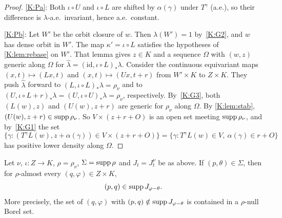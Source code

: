 \begin{proof}
\ref{K:Pa}: Both $\iota\circ U$ and $\iota\circ L$ are shifted by $\alpha(\gamma)$ under
$T^\gamma$ (a.e.), so their difference is $\lambda$-a.e.\ invariant, hence a.e.\ constant.

\ref{K:Pb}: Let $W'$ be the orbit closure of $w$. Then $\lambda(W')=1$ by~\ref{K:G2}, and $w$
has dense orbit in $W'$.
The map $\kappa'=\iota\circ L$ satisfies the hypotheses of \cref{K:lem:rebase} on $W'$.
That lemma gives $z\in K$ and a \Fol{} sequence $\Omega$ with $(w,z)$ generic along $\Omega$
for $\hat\lambda=(\mathrm{id},\iota\circ L)_*\lambda$.
Consider the continuous equivariant maps $(x,t)\mapsto(Lx,t)$ and $(x,t)\mapsto(Ux,t+r)$
from $W'\times K$ to $Z\times K$.
They push $\hat\lambda$ forward to $(L,\iota\circ L)_*\lambda=\rho_\nu$ and to
$(U,\iota\circ L+r)_*\lambda=(U,\iota\circ U)_*\lambda=\rho_\nu$, respectively.
By~\ref{K:G3}, both $(L(w),z)$ and $(U(w),z+r)$ are generic for $\rho_\nu$ along $\Omega$.
By \cref{K:lem:stab}, $(U(w),z+r)\in\operatorname{supp}\rho_\nu$.
So $V\times(z+r+O)$ is an open set meeting $\operatorname{supp}\rho_\nu$, and by~\ref{K:G1} the set
\[
\{\gamma:(T^\gamma L(w),z+\alpha(\gamma))\in V\times(z+r+O)\}=\{\gamma:T^\gamma L(w)\in V,\ \alpha(\gamma)\in r+O\}
\]
has positive lower density along $\Omega$.
\end{proof}

\begin{lemma}\label{K:lem:PS}
Let $\nu$, $\iota\colon Z\to K$, $\rho=\rho_\nu$, $\Sigma=\operatorname{supp}\rho$ and $J_t=J^\nu_t$ be as above.
If $(p,\theta)\in\Sigma$, then for $\rho$-almost every $(q,\varphi)\in Z\times K$,
\[
(p,q)\in\operatorname{supp} J_{\varphi-\theta}.
\]
More precisely, the set of $(q,\varphi)$ with $(p,q)\notin\operatorname{supp} J_{\varphi-\theta}$ is
contained in a $\rho$-null Borel set.
\end{lemma}

